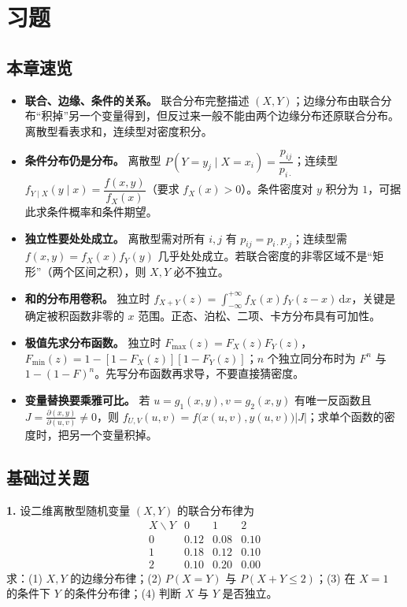 \section{习题}

\subsection{本章速览}

\begin{itemize}
  \item \textbf{联合、边缘、条件的关系。} 联合分布完整描述 $(X,Y)$；边缘分布由联合分布“积掉”另一个变量得到，但反过来一般不能由两个边缘分布还原联合分布。离散型看表求和，连续型对密度积分。
  \item \textbf{条件分布仍是分布。} 离散型 $P(Y=y_j\mid X=x_i)=\dfrac{p_{ij}}{p_{i\cdot}}$；连续型 $f_{Y\mid X}(y\mid x)=\dfrac{f(x,y)}{f_X(x)}$（要求 $f_X(x)>0$）。条件密度对 $y$ 积分为 $1$，可据此求条件概率和条件期望。
  \item \textbf{独立性要处处成立。} 离散型需对所有 $i,j$ 有 $p_{ij}=p_{i\cdot}p_{\cdot j}$；连续型需 $f(x,y)=f_X(x)f_Y(y)$ 几乎处处成立。若联合密度的非零区域不是“矩形”（两个区间之积），则 $X,Y$ 必不独立。
  \item \textbf{和的分布用卷积。} 独立时 $f_{X+Y}(z)=\displaystyle\int_{-\infty}^{+\infty}f_X(x)f_Y(z-x)\,\mathrm dx$，关键是确定被积函数非零的 $x$ 范围。正态、泊松、二项、卡方分布具有可加性。
  \item \textbf{极值先求分布函数。} 独立时 $F_{\max}(z)=F_X(z)F_Y(z)$，$F_{\min}(z)=1-[1-F_X(z)][1-F_Y(z)]$；$n$ 个独立同分布时为 $F^n$ 与 $1-(1-F)^n$。先写分布函数再求导，不要直接猜密度。
  \item \textbf{变量替换要乘雅可比。} 若 $u=g_1(x,y),v=g_2(x,y)$ 有唯一反函数且 $J=\frac{\partial(x,y)}{\partial(u,v)}\neq0$，则 $f_{U,V}(u,v)=f\bigl(x(u,v),y(u,v)\bigr)|J|$；求单个函数的密度时，把另一个变量积掉。
\end{itemize}

\subsection{基础过关题}

\textbf{1.} 设二维离散型随机变量 $(X,Y)$ 的联合分布律为
\[
\begin{array}{c|ccc}
X\backslash Y & 0 & 1 & 2\\
\hline
0 & 0.12 & 0.08 & 0.10\\
1 & 0.18 & 0.12 & 0.10\\
2 & 0.10 & 0.20 & 0.00
\end{array}
\]
求：(1) $X,Y$ 的边缘分布律；(2) $P(X=Y)$ 与 $P(X+Y\leq 2)$；(3) 在 $X=1$ 的条件下 $Y$ 的条件分布律；(4) 判断 $X$ 与 $Y$ 是否独立。

